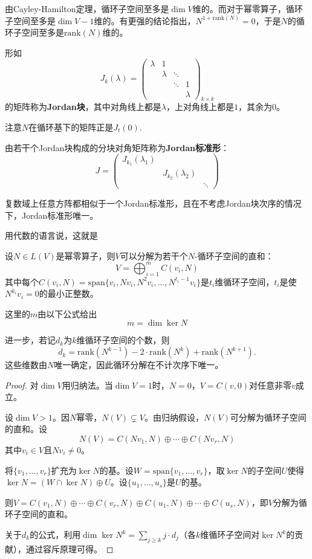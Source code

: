由Cayley-Hamilton定理，循环子空间至多是$\dim V$维的。而对于幂零算子，循环子空间至多是$\dim V-1$维的。有更强的结论指出，$N^{1+\mathrm{rank}(N)}=0$，于是$N$的循环子空间至多是$\mathrm{rank}(N)$维的。

\begin{definition}[Jordan块]
形如
\[
J_k(\lambda) = \begin{pmatrix}
\lambda & 1 & & \\
& \lambda & \ddots & \\
& & \ddots & 1 \\
& & & \lambda
\end{pmatrix}_{k \times k}
\]
的矩阵称为\textbf{Jordan块}，其中对角线上都是$\lambda$，上对角线上都是$1$，其余为$0$。
\end{definition}
注意$N$在循环基下的矩阵正是$J_t(0)$.
\begin{definition}[Jordan标准形]
由若干个Jordan块构成的分块对角矩阵称为\textbf{Jordan标准形}：
\[
J = \begin{pmatrix}
J_{k_1}(\lambda_1) & & \\
& J_{k_2}(\lambda_2) & \\
& & \ddots
\end{pmatrix}
\]
\end{definition}

\begin{theorem}[Jordan标准形定理]
复数域上任意方阵都相似于一个Jordan标准形，且在不考虑Jordan块次序的情况下，Jordan标准形唯一。
\end{theorem}
用代数的语言说，这就是

\begin{theorem}[幂零算子的循环分解定理]
设$N \in L(V)$是幂零算子，则$V$可以分解为若干个$N$-循环子空间的直和：
\[
V = \bigoplus_{i=1}^m C(v_i, N)
\]
其中每个$C(v_i, N) = \mathrm{span}\{v_i, Nv_i, N^2v_i, \ldots, N^{t_i-1}v_i\}$是$t_i$维循环子空间，$t_i$是使$N^{k_i}v_i = 0$的最小正整数。

这里的$m$由以下公式给出
\[
m=\dim\ker N
\]

进一步，若记$d_k$为$k$维循环子空间的个数，则
\[
d_k = \mathrm{rank}(N^{k-1}) - 2\cdot\mathrm{rank}(N^k) + \mathrm{rank}(N^{k+1}).
\]
这些维数由$N$唯一确定，因此循环分解在不计次序下唯一。
\end{theorem}

\begin{proof}
对$\dim V$用归纳法。当$\dim V = 1$时，$N = 0$，$V = C(v, 0)$对任意非零$v$成立。

设$\dim V > 1$。因$N$幂零，$N(V) \subsetneq V$。由归纳假设，$N(V)$可分解为循环子空间的直和。设
\[
N(V) = C(Nv_1, N) \oplus \cdots \oplus C(Nv_r, N)
\]
其中$v_i \in V$且$Nv_i \neq 0$。

将$\{v_1, \ldots, v_r\}$扩充为$\ker N$的基。设$W = \mathrm{span}\{v_1, \ldots, v_r\}$，取$\ker N$的子空间$U$使得$\ker N = (W \cap \ker N) \oplus U$。设$\{u_1, \ldots, u_s\}$是$U$的基。

则$V = C(v_1, N) \oplus \cdots \oplus C(v_r, N) \oplus C(u_1, N) \oplus \cdots \oplus C(u_s, N)$，即$V$分解为循环子空间的直和。

关于$d_k$的公式，利用$\dim \ker N^k = \sum_{j \geq k} j \cdot d_j$（各$k$维循环子空间对$\ker N^k$的贡献），通过容斥原理可得。
\end{proof}

